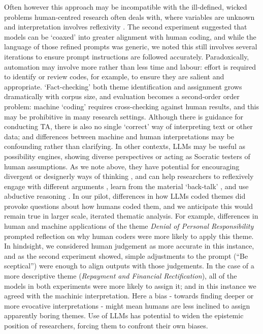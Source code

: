 \documentclass{article}
\begin{document}
Often however this approach may be incompatible with the ill-defined, wicked problems human-centred research often deals with, where variables are unknown and interpretation involves reflexivity  \cite{rittelDilemmasGeneralTheory1973}. The second experiment suggested that models can be `coaxed' into greater alignment with human coding, and while the language of those refined prompts was generic, we noted this still involves several iterations to ensure prompt instructions are followed accurately. Paradoxically, automation may involve more rather than less time and labour: effort is required to identify or review codes, for example, to ensure they are salient and appropriate. `Fact-checking' both theme identification and assignment grows dramatically with corpus size, and evaluation becomes a second-order order problem: machine `coding' requires cross-checking against human results, and this may be prohibitive in many research settings. Although there is guidance for conducting TA, there is also no single `correct' way of interpreting text or other data; and differences between machine and human interpretations may be confounding rather than clarifying. In other contexts, LLMs may be useful as possibility engines, showing diverse perspectives or acting as Socratic testers of human assumptions. As we note above, they have potential for encouraging divergent \cite{banathyDesigningSocialSystems1996} or designerly ways of thinking \cite{crossDesignerlyWaysKnowing1982}, and can help researchers to reflexively engage with different arguments \cite{rittelSecondGenerationDesignMethods1984}, learn from the material `back-talk' \cite{schonReflectivePractitionerHow1983}, and use abductive reasoning \cite{kolkoAbductiveThinkingSensemaking2010}. In our pilot, differences in how LLMs coded themes did provoke questions about how humans coded them, and we anticipate this would remain true in larger scale, iterated thematic analysis. For example, differences in human and machine applications of the theme \emph{Denial of Personal Responsibility} prompted reflection on why human coders were more likely to apply this theme. In hindsight, we considered human judgement as more accurate in this instance, and as the second experiment showed, simple adjustments to the prompt (``Be sceptical'') were enough to align outputs with those judgements. In the case of a more descriptive theme (\emph{Repayment and Financial Rectification}), all of the models in both experiments were more likely to assign it; and in this instance we agreed with the machinic interpretation. Here a bias - towards finding deeper or more evocative interpretations - might mean humans are less inclined to assign apparently boring themes. Use of LLMs has potential to widen the epistemic position of researchers, forcing them to confront their own biases.  
\end{document}

